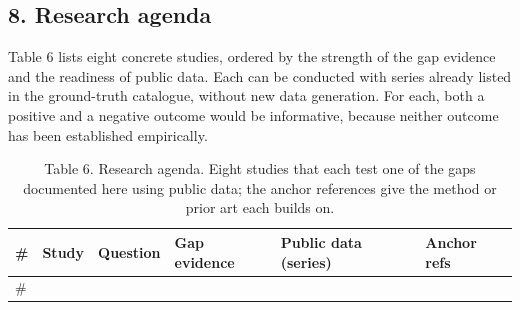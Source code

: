 \documentclass[11pt]{article}
\begin{document}
\subsection{8. Research agenda}\label{research-agenda}

Table 6 lists eight concrete studies, ordered by the strength of the gap
evidence and the readiness of public data. Each can be conducted with
series already listed in the ground-truth catalogue, without new data
generation. For each, both a positive and a negative outcome would be
informative, because neither outcome has been established empirically.

\begin{scriptsize}

\begin{longtable}[]{@{}
  >{\raggedright\arraybackslash}p{}
  >{\raggedright\arraybackslash}p{}
  >{\raggedright\arraybackslash}p{}
  >{\raggedright\arraybackslash}p{}
  >{\raggedright\arraybackslash}p{}
  >{\raggedright\arraybackslash}p{}@{}}
\caption{Table 6. Research agenda. Eight studies that each test one of
the gaps documented here using public data; the anchor references give
the method or prior art each builds on.}\tabularnewline
\toprule\noalign{}
\begin{minipage}[b]{\linewidth}\raggedright
\#
\end{minipage} & \begin{minipage}[b]{\linewidth}\raggedright
Study
\end{minipage} & \begin{minipage}[b]{\linewidth}\raggedright
Question
\end{minipage} & \begin{minipage}[b]{\linewidth}\raggedright
Gap evidence
\end{minipage} & \begin{minipage}[b]{\linewidth}\raggedright
Public data (series)
\end{minipage} & \begin{minipage}[b]{\linewidth}\raggedright
Anchor refs
\end{minipage} \\
\midrule\noalign{}
\endfirsthead
\toprule\noalign{}
\begin{minipage}[b]{\linewidth}\raggedright
\#

\end{minipage}
\end{longtable}
\end{scriptsize}
\end{document}
